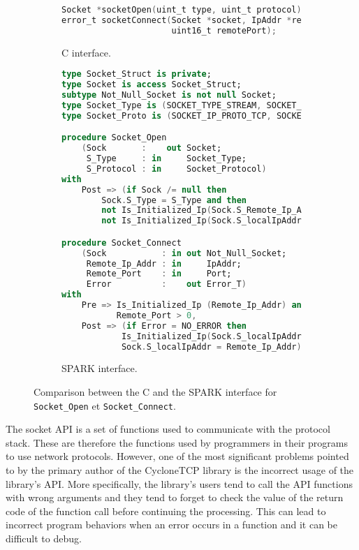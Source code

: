 \documentclass[runningheads]{llncs}
\begin{document}
\begin{figure}[t]
\begin{subfigure}{\textwidth}
\begin{lstlisting}[language=C, frame=bottomline]
Socket *socketOpen(uint_t type, uint_t protocol);
error_t socketConnect(Socket *socket, IpAddr *remoteIpAddr,
                      uint16_t remotePort);
\end{lstlisting}
\caption{C interface.}
\label{Fig:socketInterface:C}
\end{subfigure}
\begin{subfigure}{\textwidth}
\begin{lstlisting}[language=Ada, frame=bottomline]
type Socket_Struct is private;
type Socket is access Socket_Struct;
subtype Not_Null_Socket is not null Socket;
type Socket_Type is (SOCKET_TYPE_STREAM, SOCKET_TYPE_DGRAM);
type Socket_Proto is (SOCKET_IP_PROTO_TCP, SOCKET_IP_PROTO_UDP);

procedure Socket_Open
    (Sock       :    out Socket;
     S_Type     : in     Socket_Type;
     S_Protocol : in     Socket_Protocol)
with 
    Post => (if Sock /= null then
        Sock.S_Type = S_Type and then
        not Is_Initialized_Ip(Sock.S_Remote_Ip_Addr) and then
        not Is_Initialized_Ip(Sock.S_localIpAddr));

procedure Socket_Connect
    (Sock           : in out Not_Null_Socket;
     Remote_Ip_Addr : in     IpAddr;
     Remote_Port    : in     Port;
     Error          :    out Error_T)
with
    Pre => Is_Initialized_Ip (Remote_Ip_Addr) and then
           Remote_Port > 0,
    Post => (if Error = NO_ERROR then
            Is_Initialized_Ip(Sock.S_localIpAddr) and then
            Sock.S_localIpAddr = Remote_Ip_Addr);
\end{lstlisting}
\caption{SPARK interface.}
\label{Fig:socketInterface:SPARK}
\end{subfigure}
\caption{Comparison between the C and the SPARK interface for \texttt{Socket\_Open} et \texttt{Socket\_Connect}.}
\label{Fig:socketInterface}
\end{figure}

    The socket API is a set of functions used to communicate with the protocol stack. These are therefore the functions used
    by programmers in their programs to use network protocols. However, one of the most significant problems pointed to by the
    primary author of the CycloneTCP library is the incorrect usage of the library's API. More specifically, the library's users
    tend to call the API functions with wrong arguments and they tend to forget to check the value of the return code of the
    function call before continuing the processing. This can lead to incorrect program behaviors when an error occurs in a function
    and it can be difficult to debug.
\end{document}
